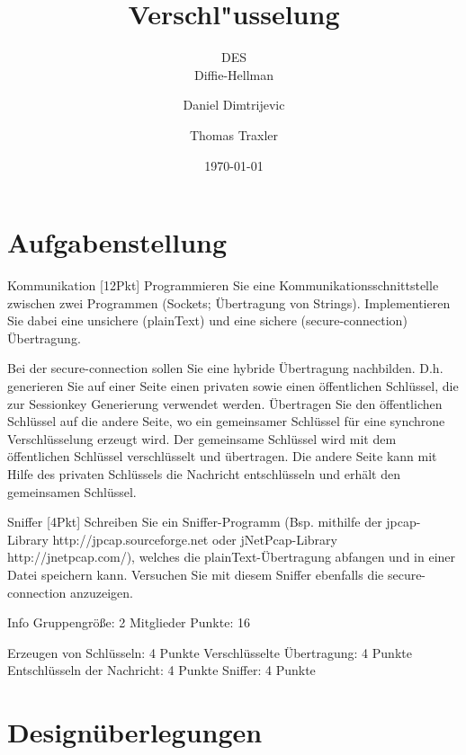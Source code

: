 \documentclass[a4paper,12pt]{scrreprt}
\begin{document}
\author{Daniel Dimtrijevic \and Thomas Traxler} %
\title{ Verschl"usselung } %
\subject{VSDB} %
\subtitle{ DES \\ Diffie-Hellman } %
\date{\today} %
\publishers{5AHITT} %

\maketitle
\tableofcontents


\chapter{Aufgabenstellung}
Kommunikation [12Pkt]
Programmieren Sie eine Kommunikationsschnittstelle zwischen zwei Programmen (Sockets; Übertragung von Strings). Implementieren Sie dabei eine unsichere (plainText) und eine sichere (secure-connection) Übertragung.

Bei der secure-connection sollen Sie eine hybride Übertragung nachbilden. D.h. generieren Sie auf einer Seite einen privaten sowie einen öffentlichen Schlüssel, die zur Sessionkey Generierung verwendet werden. Übertragen Sie den öffentlichen Schlüssel auf die andere Seite, wo ein gemeinsamer Schlüssel für eine synchrone Verschlüsselung erzeugt wird. Der gemeinsame Schlüssel wird mit dem öffentlichen Schlüssel verschlüsselt und übertragen. Die andere Seite kann mit Hilfe des privaten Schlüssels die Nachricht entschlüsseln und erhält den gemeinsamen Schlüssel.

Sniffer [4Pkt]
Schreiben Sie ein Sniffer-Programm (Bsp. mithilfe der jpcap-Library http://jpcap.sourceforge.net  oder jNetPcap-Library http://jnetpcap.com/), welches die plainText-Übertragung abfangen und in einer Datei speichern kann. Versuchen Sie mit diesem Sniffer ebenfalls die secure-connection anzuzeigen.

Info
Gruppengröße: 2 Mitglieder
Punkte: 16

    Erzeugen von Schlüsseln: 4 Punkte
    Verschlüsselte Übertragung: 4 Punkte
    Entschlüsseln der Nachricht: 4 Punkte
    Sniffer: 4 Punkte

	
\chapter{Designüberlegungen}
	
\end{document}
